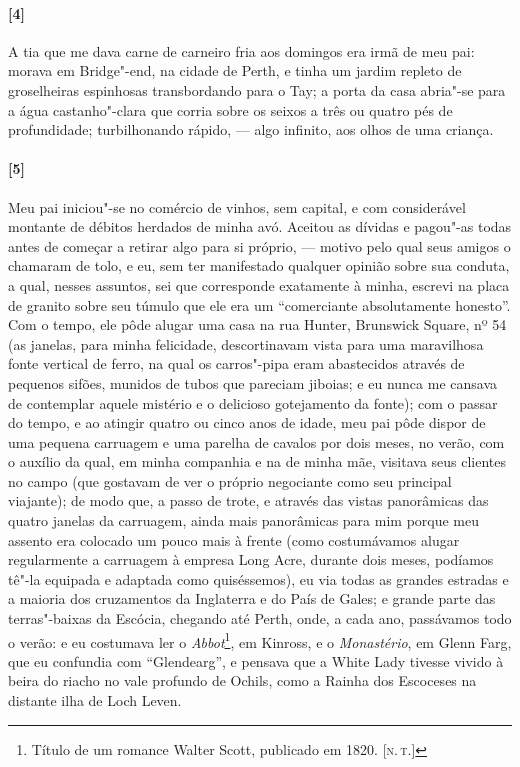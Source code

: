 \paragraph{[4]} A tia que me dava carne de carneiro fria aos domingos era irmã de meu
pai: morava em Bridge"-end, na cidade de Perth, e tinha um jardim repleto
de groselheiras espinhosas transbordando para o Tay; a porta da casa
abria"-se para a água castanho"-clara que corria sobre os seixos a três ou
quatro pés de profundidade; turbilhonando rápido, --- algo infinito, aos
olhos de uma criança.

\paragraph{[5]} Meu pai iniciou"-se no comércio de vinhos, sem capital, e com
considerável montante de débitos herdados de minha avó. Aceitou as
dívidas e pagou"-as todas antes de começar a retirar algo para si
próprio, --- motivo pelo qual seus amigos o chamaram de tolo, e eu, sem
ter manifestado qualquer opinião sobre sua conduta, a qual, nesses
assuntos, sei que corresponde exatamente à minha, escrevi na placa de
granito sobre seu túmulo que ele era um ``comerciante absolutamente
honesto''. Com o tempo, ele pôde alugar uma casa na rua Hunter,
Brunswick Square, nº 54 (as janelas, para minha felicidade,
descortinavam vista para uma maravilhosa fonte vertical de ferro, na
qual os carros"-pipa eram abastecidos através de pequenos sifões, munidos
de tubos que pareciam jiboias; e eu nunca me cansava de contemplar
aquele mistério e o delicioso gotejamento da fonte); com o passar do
tempo, e ao atingir quatro ou cinco anos de idade, meu pai pôde dispor
de uma pequena carruagem e uma parelha de cavalos por dois meses, no
verão, com o auxílio da qual, em minha companhia e na de minha mãe,
visitava seus clientes no campo (que gostavam de ver o próprio
negociante como seu principal viajante); de modo que, a passo de trote,
e através das vistas panorâmicas das quatro janelas da carruagem, ainda
mais panorâmicas para mim porque meu assento era colocado um pouco mais
à frente (como costumávamos alugar regularmente a carruagem à empresa
Long Acre, durante dois meses, podíamos tê"-la equipada e adaptada como
quiséssemos), eu via todas as grandes estradas e a maioria dos
cruzamentos da Inglaterra e do País de Gales; e grande parte das
terras"-baixas da Escócia, chegando até Perth, onde, a cada ano,
passávamos todo o verão: e eu costumava ler o \emph{Abbot}\footnote{Título
  de um romance Walter Scott, publicado em 1820. {[}\textsc{n.\,t.}{]}},
em Kinross, e o \emph{Monastério}, em Glenn Farg, que eu confundia com
``Glendearg'', e pensava que a White Lady tivesse vivido à beira do
riacho no vale profundo de Ochils, como a Rainha dos Escoceses na
distante ilha de Loch Leven.

